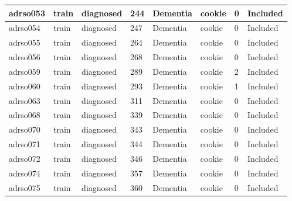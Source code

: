\begin{center}
\begin{longtable}{|l|l|l|l|l|l|l|l|}
adrso053       & train                 & diagnosed         & 244                & Dementia             & cookie          & 0                & Included      \\ \hline
adrso054       & train                 & diagnosed         & 247                & Dementia             & cookie          & 0                & Included      \\ \hline
adrso055       & train                 & diagnosed         & 264                & Dementia             & cookie          & 0                & Included      \\ \hline
adrso056       & train                 & diagnosed         & 268                & Dementia             & cookie          & 0                & Included      \\ \hline
adrso059       & train                 & diagnosed         & 289                & Dementia             & cookie          & 2                & Included      \\ \hline
adrso060       & train                 & diagnosed         & 293                & Dementia             & cookie          & 1                & Included      \\ \hline
adrso063       & train                 & diagnosed         & 311                & Dementia             & cookie          & 0                & Included      \\ \hline
adrso068       & train                 & diagnosed         & 339                & Dementia             & cookie          & 0                & Included      \\ \hline
adrso070       & train                 & diagnosed         & 343                & Dementia             & cookie          & 0                & Included      \\ \hline
adrso071       & train                 & diagnosed         & 344                & Dementia             & cookie          & 0                & Included      \\ \hline
adrso072       & train                 & diagnosed         & 346                & Dementia             & cookie          & 0                & Included      \\ \hline
adrso074       & train                 & diagnosed         & 357                & Dementia             & cookie          & 0                & Included      \\ \hline
adrso075       & train                 & diagnosed         & 360                & Dementia             & cookie          & 0                & Included      \\ \hline

\end{longtable}
\end{center}
